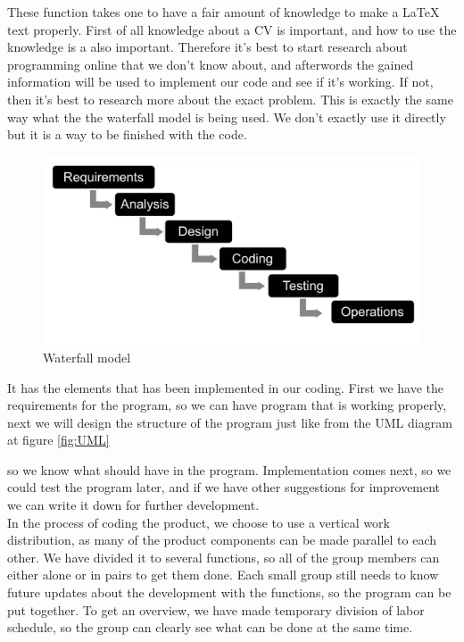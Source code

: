 These function takes one to have a fair amount of knowledge to make a LaTeX text properly.
First of all knowledge about a CV is important, and how to use the knowledge is a also important.
Therefore it's best to start research about programming online that we don't know about, 
and afterwords the gained information will be used to implement our code and see if it's working. 
If not, then it's best to research more about the exact problem.
This is exactly the same way what the the waterfall model is being used.
We don't exactly use it directly but it is a way to be finished with the code.
\begin{figure}[H]
  \centering
  \includegraphics[scale = 0.2]{figures/vandfald}
  \caption{Waterfall model \cite{Waterfall_model}}
\end{figure}

It has the elements that has been implemented in our coding. First we have the requirements for the program, 
so we can have program that is working properly, 
next we will design the structure of the program just like from the UML diagram at figure \vref{fig:UML}
 
so we know what should have in the program. Implementation comes next, so we could test the program later, 
and if we have other suggestions for improvement we can write it down for further development.\\

In the process of coding the product, we choose to use a vertical work distribution, as many of the product
components can be made parallel to each other. We have divided it to several functions, 
so all of the group members can either alone or in pairs to get them done.
Each small group still needs to know future updates about the development with the functions, so the program can be put together.
To get an overview, we have made temporary division of labor
schedule, so the group can clearly see what can be done at the same time. \\

